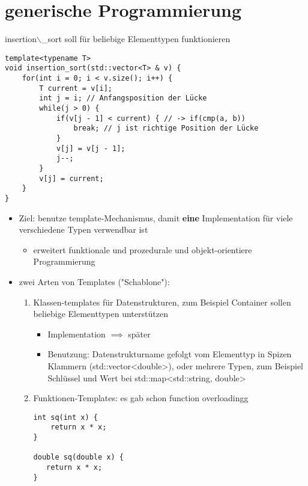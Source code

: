 \documentclass[a4paper]{scrartcl}
\theoremstyle{definition}
\theoremstyle{plain}
\theoremstyle{remark}
\theoremstyle{remark}
\begin{document}
\section{generische Programmierung}
\label{sec-14}
insertion$\backslash$\_sort soll für beliebige Elementtypen funktionieren
\begin{verbatim}
template<typename T>
void insertion_sort(std::vector<T> & v) {
	for(int i = 0; i < v.size(); i++) {
		T current = v[i];
		int j = i; // Anfangsposition der Lücke
		while(j > 0) {
			if(v[j - 1] < current) { // -> if(cmp(a, b))
				break; // j ist richtige Position der Lücke
			}
			v[j] = v[j - 1];
			j--;
		}
		v[j] = current;
	}
}
\end{verbatim}
\begin{itemize}
\item Ziel: benutze template-Mechanismus, damit \textbf{eine} Implementation für viele verschiedene Typen verwendbar ist
\begin{itemize}
\item erweitert funktionale und prozedurale und objekt-orientiere Programmierung
\end{itemize}
\item zwei Arten von Templates ("Schablone"):
\begin{enumerate}
\item Klassen-templates für Datenstrukturen, zum Beispiel Container sollen beliebige Elementtypen unterstützen
\begin{itemize}
\item Implementation $\implies$ später
\item Benutzung: Datenstrukturname gefolgt vom Elementtyp in Spizen Klammern (std::vector<double>), oder mehrere Typen, zum Beispiel Schlüssel und Wert bei std::map<std::string, double>
\end{itemize}
\item Funktionen-Templates: es gab schon function overloadingg
\begin{verbatim}
int sq(int x) {
	return x * x;
}

double sq(double x) {
   return x * x;
}


\end{verbatim}
\end{enumerate}
\end{itemize}
\end{document}

